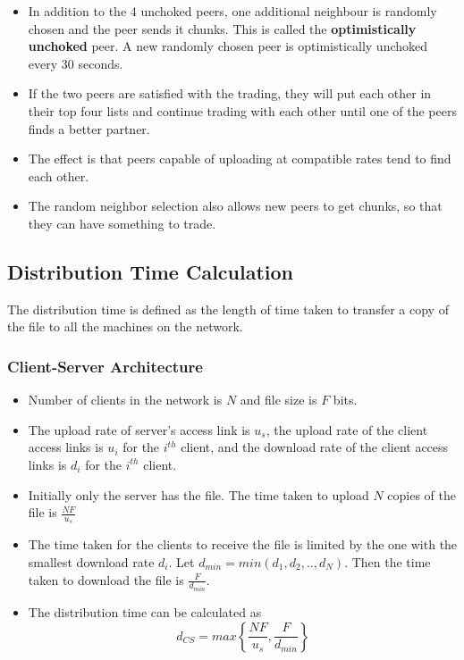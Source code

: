 \documentclass{article}
\theoremstyle{plain}
\theoremstyle{definition}
\begin{document}
\begin{itemize}
    \item In addition to the 4 unchoked peers, one additional neighbour is randomly chosen and the peer sends it chunks. This is called the \textbf{optimistically unchoked} peer. A new randomly chosen peer is optimistically unchoked every 30 seconds. 
    
    \item If the two peers are satisfied with the trading, they will put each other in their top four lists and continue trading with each other until one of the peers finds a better partner. 
    
    \item The effect is that peers capable of uploading at compatible rates tend to find each other. 
    
    \item The random neighbor selection also allows new peers to get chunks, so that they can have something to trade.
\end{itemize}

\subsection{Distribution Time Calculation}
The distribution time is defined as the length of time taken to transfer a copy of the file to all the machines on the network.
\subsubsection{Client-Server Architecture}
\begin{itemize}
    \item Number of clients in the network is $N$ and file size is $F$ bits.
    
    \item The upload rate of server's access link is $u_s$, the upload rate of the client access links is $u_i$ for the $i^{th}$ client, and the download rate of the client access links is $d_i$ for the $i^{th}$ client.
    
    \item Initially only the server has the file. The time taken to upload $N$ copies of the file is $\frac{NF}{u_s}$
    
    \item The time taken for the clients to receive the file is limited by the one with the smallest download rate $d_i$. Let $d_{min} = min(d_1, d_2, .., d_N)$. Then the time taken to download the file is $\frac{F}{d_{min}}$. 
    
    \item The distribution time can be calculated as
    \begin{equation}
        d_{CS} = max \left \{ \frac{NF}{u_s}, \frac{F}{d_{min}}  \right \}
    \end{equation}
\end{itemize}
\end{document}
